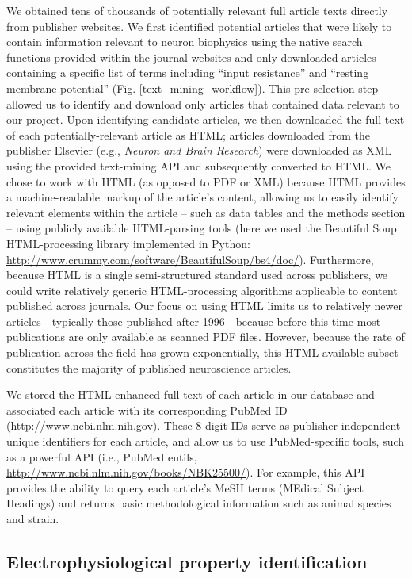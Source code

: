 \documentclass{template/frontiersSCNS} %
\begin{document}
We obtained tens of thousands of potentially relevant full article texts directly from publisher websites.  
We first identified potential articles that were likely to contain information relevant to neuron biophysics using the native search functions provided within the journal websites and only downloaded articles containing a specific list of terms including ``input resistance'' and ``resting membrane potential'' (Fig. \ref{text_mining_workflow}).  
This pre-selection step allowed us to identify and download only articles that contained data relevant to our project.  
Upon identifying candidate articles, we then downloaded the full text of each potentially-relevant article as HTML; 
articles downloaded from the publisher Elsevier (e.g., \emph{Neuron and Brain Research}) were downloaded as XML using the provided text-mining API and subsequently converted to HTML.  
We chose to work with HTML (as opposed to PDF or XML) because HTML provides a machine-readable markup of the article's content, allowing us to easily identify relevant elements within the article -- such as data tables and the methods section -- using publicly available HTML-parsing tools (here we used the Beautiful Soup HTML-processing library implemented in Python: \url{http://www.crummy.com/software/BeautifulSoup/bs4/doc/}).  
Furthermore, because HTML is a single semi-structured standard used across publishers, we could write relatively generic HTML-processing algorithms applicable to content published across journals.  
Our focus on using HTML limits us to relatively newer articles - typically those published after 1996 - because before this time most publications are only available as scanned PDF files.  
However, because the rate of publication across the field has grown exponentially, this HTML-available subset constitutes the majority of published neuroscience articles.

We stored the HTML-enhanced full text of each article in our database and associated each article with its corresponding PubMed ID (\url{http://www.ncbi.nlm.nih.gov}).  
These 8-digit IDs serve as publisher-independent unique identifiers for each article, and allow us to use PubMed-specific tools, such as a powerful API (i.e., PubMed eutils, \url{http://www.ncbi.nlm.nih.gov/books/NBK25500/}).  
For example, this API provides the ability to query each article's MeSH terms (MEdical Subject Headings) and returns basic methodological information such as animal species and strain.

\subsection{Electrophysiological property identification}
\end{document}
